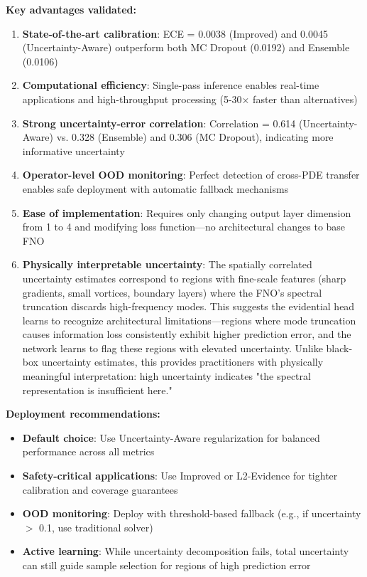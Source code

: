 \textbf{Key advantages validated:}
\begin{enumerate}
\item \textbf{State-of-the-art calibration}: ECE = 0.0038 (Improved) and 0.0045 (Uncertainty-Aware) outperform both MC Dropout (0.0192) and Ensemble (0.0106)

\item \textbf{Computational efficiency}: Single-pass inference enables real-time applications and high-throughput processing (5-30× faster than alternatives)

\item \textbf{Strong uncertainty-error correlation}: Correlation = 0.614 (Uncertainty-Aware) vs. 0.328 (Ensemble) and 0.306 (MC Dropout), indicating more informative uncertainty

\item \textbf{Operator-level OOD monitoring}: Perfect detection of cross-PDE transfer enables safe deployment with automatic fallback mechanisms

\item \textbf{Ease of implementation}: Requires only changing output layer dimension from 1 to 4 and modifying loss function—no architectural changes to base FNO

\item \textbf{Physically interpretable uncertainty}: The spatially correlated uncertainty estimates correspond to regions with fine-scale features (sharp gradients, small vortices, boundary layers) where the FNO's spectral truncation discards high-frequency modes. This suggests the evidential head learns to recognize architectural limitations—regions where mode truncation causes information loss consistently exhibit higher prediction error, and the network learns to flag these regions with elevated uncertainty. Unlike black-box uncertainty estimates, this provides practitioners with physically meaningful interpretation: high uncertainty indicates "the spectral representation is insufficient here."
\end{enumerate}

\textbf{Deployment recommendations:}
\begin{itemize}
\item \textbf{Default choice}: Use Uncertainty-Aware regularization for balanced performance across all metrics
\item \textbf{Safety-critical applications}: Use Improved or L2-Evidence for tighter calibration and coverage guarantees
\item \textbf{OOD monitoring}: Deploy with threshold-based fallback (e.g., if uncertainty $>$ 0.1, use traditional solver)
\item \textbf{Active learning}: While uncertainty decomposition fails, total uncertainty can still guide sample selection \cite{settles2009active} for regions of high prediction error
\end{itemize}

